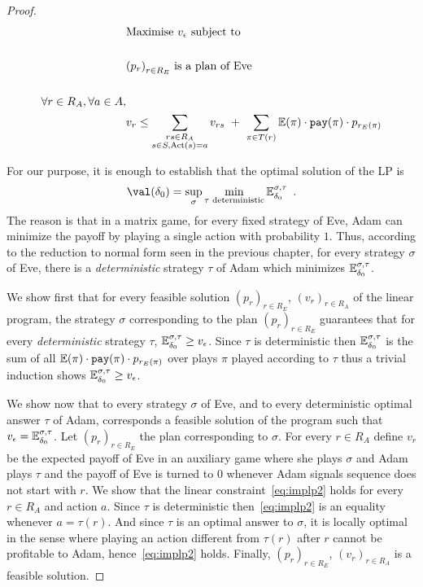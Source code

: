 \begin{proof}
\begin{align}
&\text{Maximise $v_{\epsilon}$ subject to}
\notag\\
\notag\\
\notag&\text{$\left(p_r\right)_{r \in R_E}$ is a plan of Eve}
\notag\\
\notag\\
\notag\forall r \in R_A,
\forall a \in A,&
\\
&
\label{eq:implp2}
v_{r} \leq \sum\limits_{\substack{rs \in R_A\\s \in S, \text{Act}(s)=a}}
v_{rs}~+~\sum\limits_{\pi \in T(r)} \mathbb{E}(\pi) \cdot {\tt pay}(\pi) \cdot 
p_{r_E(\pi)}
\end{align}

For our purpose,
it is enough to establish 
that the optimal solution of the LP
is 
\[
\val(\ini) = \sup_\sigma \min\limits_{\tau\text{ deterministic}} \mathbb{E}_{\ini}^{\sigma,\tau}\enspace.
\]
The reason is that in a matrix game,
for every fixed strategy of Eve,
Adam can minimize the payoff by playing a single action
with probability $1$.
Thus, according to the reduction to normal form seen in the previous chapter,
for every strategy $\sigma$ of Eve,
there is a \emph{deterministic} strategy $\tau$ of Adam
which minimizes $\mathbb{E}_{\delta_0}^{\sigma,\tau}$.



We show first that for every feasible solution 
$(p_r)_{r \in R_E}$, $(v_r)_{r\in R_A}$ of the linear program,
the strategy $\sigma$ corresponding to the plan $(p_r)_{r \in R_E}$
guarantees that for every \emph{deterministic} strategy $\tau$,
$\mathbb{E}_{\delta_0}^{\sigma,\tau} \geq v_\epsilon$.
Since $\tau$ is deterministic
then $\mathbb{E}_{\delta_0}^{\sigma,\tau}$
is the sum of all $\mathbb{E}(\pi) \cdot {\tt pay}(\pi) \cdot 
p_{r_E(\pi)}$ over plays $\pi$ played according to $\tau$
thus a trivial induction shows $\mathbb{E}_{\delta_0}^{\sigma,\tau}\geq v_\epsilon$.

We show now that to every strategy $\sigma$ of Eve,
and to every deterministic optimal answer $\tau$ of Adam, 
corresponds a feasible solution of the program
such that $v_\epsilon = \mathbb{E}_{\delta_0}^{\sigma,\tau}$.
Let  $(p_r)_{r \in R_E}$ the plan corresponding to $\sigma$.
For every $r\in R_A$ define $v_r$ be the expected payoff of Eve
in an auxiliary game where she plays $\sigma$
and Adam plays $\tau$ and the payoff of Eve is turned to $0$
whenever Adam signals sequence does not start with $r$.
We show that the linear constraint~\eqref{eq:implp2} holds for every $r\in R_A$
 and action $a$.
Since $\tau$ is deterministic then~\eqref{eq:implp2} is an equality
whenever $a=\tau(r)$.
And since $\tau$ is an optimal answer to $\sigma$,
it is locally optimal in the sense where playing an action
different from $\tau(r)$ after $r$ cannot be profitable to Adam,
hence~\eqref{eq:implp2} holds.
Finally, $(p_r)_{r \in R_E}$, $(v_r)_{r\in R_A}$ is a feasible solution.
\end{proof}

